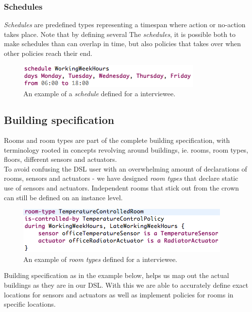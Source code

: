 \documentclass{llncs}
\begin{document}
\newpage
\subsubsection{Schedules}\label{subsubsec:schedules}
\textit{Schedules} are predefined types representing a timespan where action or no-action takes place. Note that by defining several The \textit{schedules}, it is possible both to make schedules than can overlap in time, but also policies that takes over when other policies reach their end. 

\begin{figure}
  \centering
  \includegraphics[scale=.5]{dsl-schedules.png}
  \caption{An example of a \textit{schedule} defined for a interviewee.}
  \label{fig:dsl-schedules}
\end{figure}

\subsection{Building specification}\label{subsec:buildingspecification}
Rooms and room types are part of the complete building specification, with terminology rooted in concepts revolving around buildings, ie. rooms, room types, floors, different sensors and actuators. \\

To avoid confusing the DSL user with an overwhelming amount of declarations of rooms, sensors and actuators - we have designed \textit{room types} that declare static use of sensors and actuators. Independent rooms that stick out from the crown can still be defined on an instance level.

\begin{figure}
  \centering
    \includegraphics[scale=.5]{dsl-room-types.png}
	\caption{An example of \textit{room types} defined for a interviewee.}
	\label{fig:room-types}
\end{figure}

Building specification as in the example below, helps us map out the actual buildings as they are in our DSL. With this we are able to accurately define exact locations for sensors and actuators as well as implement policies for rooms in specific locations. 
\end{document}

